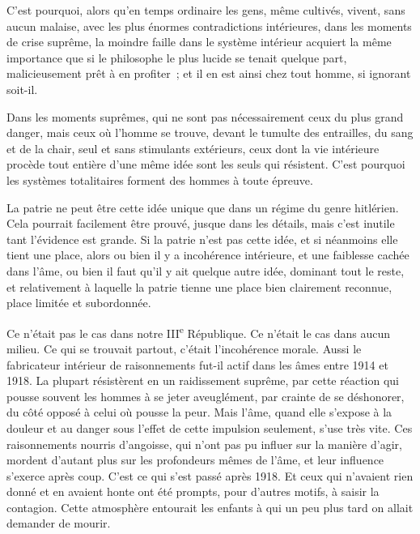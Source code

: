 \documentclass[french,twoside]{book} %
\begin{document}
C'est pourquoi, alors qu'en temps ordinaire les gens, même cultivés, vivent, sans aucun malaise, avec les plus énormes contradictions intérieures, dans les moments de crise suprême, la moindre faille dans le système intérieur acquiert la même importance que si le philosophe le plus lucide se tenait quelque part, malicieusement prêt à en profiter ; et il en est ainsi chez tout homme, si ignorant soit-il.\par
Dans les moments suprêmes, qui ne sont pas nécessairement ceux du plus grand danger, mais ceux où l'homme se trouve, devant le tumulte des entrailles, du sang et de la chair, seul et sans stimulants extérieurs, ceux dont la vie intérieure procède tout entière d'une même idée sont les seuls qui résistent. C'est pourquoi les systèmes totalitaires forment des hommes à toute épreuve.\par
\par
La patrie ne peut être cette idée unique que dans un régime du genre hitlérien. Cela pourrait facilement être prouvé, jusque dans les détails, mais c'est inutile tant l'évidence est grande. Si la patrie n'est pas cette idée, et si néanmoins elle tient une place, alors ou bien il y a incohérence intérieure, et une faiblesse cachée dans l'âme, ou bien il faut qu'il y ait quelque autre idée, dominant tout le reste, et relativement à laquelle la patrie tienne une place bien clairement reconnue, place limitée et subordonnée.\par
Ce n'était pas le cas dans notre III\textsuperscript{e} République. Ce n'était le cas dans aucun milieu. Ce qui se trouvait partout, c'était l'incohérence morale. Aussi le fabricateur intérieur de raisonnements fut-il actif dans les âmes entre 1914 et 1918. La plupart résistèrent en un raidissement suprême, par cette réaction qui pousse souvent les hommes à se jeter aveuglément, par crainte de se déshonorer, du côté opposé à celui où pousse la peur. Mais l'âme, quand elle s'expose à la douleur et au danger sous l'effet de cette impulsion seulement, s'use très vite. Ces raisonnements nourris d'angoisse, qui n'ont pas pu influer sur la manière d'agir, mordent d'autant plus sur les profondeurs mêmes de l'âme, et leur influence s'exerce après coup. C'est ce qui s'est passé après 1918. Et ceux qui n'avaient rien donné et en avaient honte ont été prompts, pour d'autres motifs, à saisir la contagion. Cette atmosphère entourait les enfants à qui un peu plus tard on allait demander de mourir.\par
\end{document}
